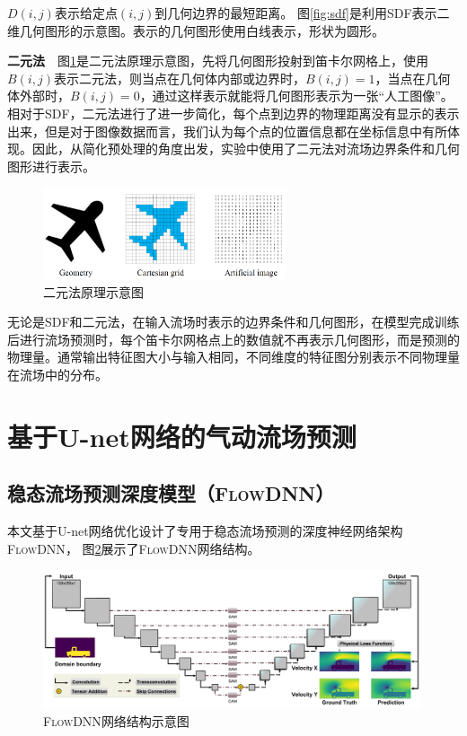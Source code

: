 $D(i, j)$表示给定点$(i, j)$到几何边界的最短距离。
图\ref{fig:sdf}是利用SDF表示二维几何图形的示意图。表示的几何图形使用白线表示，形状为圆形。


\textbf{二元法}~~图\ref{fig:binary}是二元法原理示意图，先将几何图形投射到笛卡尔网格上，使用$B(i, j)$表示二元法，则当点在几何体内部或边界时，$B(i, j) = 1$，当点在几何体外部时，$B(i, j) = 0$，通过这样表示就能将几何图形表示为一张“人工图像”。
相对于SDF，二元法进行了进一步简化，每个点到边界的物理距离没有显示的表示出来，但是对于图像数据而言，我们认为每个点的位置信息都在坐标信息中有所体现。因此，从简化预处理的角度出发，实验中使用了二元法对流场边界条件和几何图形进行表示。

\begin{figure}[htp]
	\centering
	\includegraphics[width=0.64\textwidth]{figures/binary.png}
	\caption{二元法原理示意图}
	\label{fig:binary}
\end{figure}


无论是SDF和二元法，在输入流场时表示的边界条件和几何图形，在模型完成训练后进行流场预测时，每个笛卡尔网格点上的数值就不再表示几何图形，而是预测的物理量。通常输出特征图大小与输入相同，不同维度的特征图分别表示不同物理量在流场中的分布。




\section{基于U-net网络的气动流场预测}



\subsection{稳态流场预测深度模型（\textsc{FlowDNN}）}
本文基于U-net网络优化设计了专用于稳态流场预测的深度神经网络架构\textsc{FlowDNN}，
图\ref{fig:flowdnn}展示了\textsc{FlowDNN}网络结构。


\begin{figure}[htp]
	\centering
	\includegraphics[width=0.99\textwidth]{figures/data/architecture.pdf}
	\caption{\textsc{FlowDNN}网络结构示意图}
	\label{fig:flowdnn}
\end{figure}

